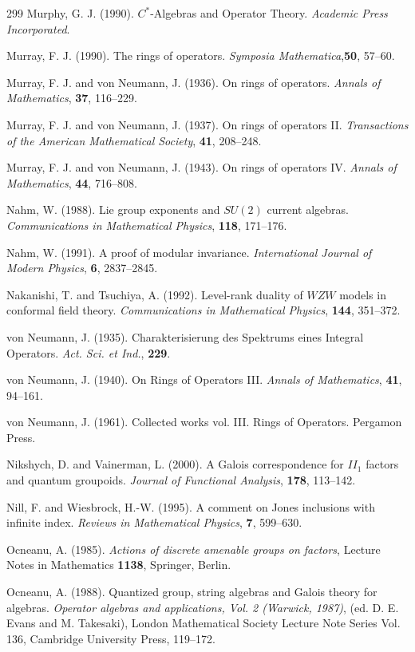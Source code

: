 \documentclass[12pt]{article}
\theoremstyle{plain}
\theoremstyle{definition}
\numberwithin{equation}{section}
\begin{document}
\begin{thebibliography} {299}
Murphy, G. J. (1990). $C^*$-Algebras and Operator Theory. {\em Academic Press Incorporated}.

Murray, F. J. (1990). The rings of operators. {\em Symposia Mathematica},{\bf 50}, 57--60.

Murray, F. J. and von Neumann, J. (1936). On rings of operators.
{\em Annals of Mathematics},
{\bf 37}, 116--229.

Murray, F. J. and von Neumann, J. (1937). On rings of operators II.
{\em Transactions of the American Mathematical Society},
{\bf 41}, 208--248.

Murray, F. J. and von Neumann, J. (1943). On rings of operators IV.
{\em Annals of Mathematics}, {\bf 44}, 716--808.

Nahm, W. (1988). Lie group exponents and $SU(2)$ current algebras.
{\em Communications in Mathematical Physics}, {\bf 118}, 171--176.

Nahm, W. (1991). A proof of modular invariance. {\em International Journal of Modern Physics},
{\bf 6}, 2837--2845.

Nakanishi, T. and Tsuchiya, A. (1992). Level-rank duality of $WZW$ models in conformal field theory.
{\em Communications in Mathematical Physics}, {\bf 144}, 351--372.

von Neumann, J. (1935). Charakterisierung des Spektrums eines Integral Operators.
{\em Act. Sci. et Ind.}, {\bf 229}.

 von Neumann, J. (1940). On Rings of Operators III. {\em Annals of Mathematics}, {\bf 41}, 94--161.

von Neumann, J. (1961). Collected works vol. III. Rings of Operators. Pergamon Press.

Nikshych, D. and Vainerman, L. (2000).
A Galois correspondence for $II_1$ factors and quantum groupoids.
{\em Journal of Functional Analysis}, {\bf 178}, 113--142.

Nill, F. and Wiesbrock, H.-W. (1995). A comment on Jones inclusions with infinite index. {\em Reviews in Mathematical Physics}, {\bf 7}, 599--630.

Ocneanu, A. (1985). {\em Actions of discrete amenable groups on factors},
Lecture Notes in Mathematics {\bf 1138}, Springer, Berlin.

Ocneanu, A. (1988). Quantized group, string algebras and Galois theory for algebras.
{\em Operator algebras and applications, Vol. 2 (Warwick, 1987)},
(ed. D. E. Evans and M. Takesaki), London Mathematical Society
Lecture Note Series Vol. 136, Cambridge University Press, 119--172.


\end{thebibliography}
\end{document}
